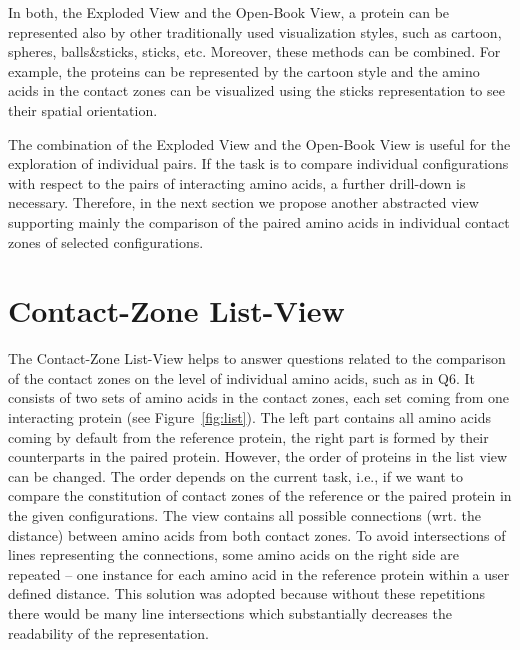 \documentclass[twocolumn]{bmcart}%
\def\OpBook {Open-Book View\xspace}
\def\ExpView {Exploded View\xspace}
\def\CoZoListView {Contact-Zone List-View\xspace}
\begin{document}
In both, the \ExpView and the \OpBook, a protein can be represented also by other traditionally used visualization styles, such as cartoon, spheres, balls\&sticks, sticks, etc.
Moreover, these methods can be combined. 
For example, the proteins can be represented by the cartoon style and the amino acids in the contact zones can be visualized using the sticks representation to see their spatial orientation.%

The combination of the \ExpView and the \OpBook is useful for the exploration of individual pairs.
If the task is to compare individual configurations with respect to the pairs of interacting amino acids, a further drill-down is necessary.
Therefore, in the next section we propose another abstracted view supporting mainly the comparison of the paired amino acids in individual contact zones of selected configurations.


\section{Contact-Zone List-View}
The \CoZoListView helps to answer questions related to the comparison of the contact zones on the level of individual amino acids, such as in Q6.
It consists of two sets of amino acids in the contact zones, each set coming from one interacting protein (see Figure~\ref{fig:list}).
The left part contains all amino acids coming by default from the reference protein, the right part is formed by their counterparts in the paired protein.
However, the order of proteins in the list view can be changed.
The order depends on the current task, i.e., if we want to compare the constitution of contact zones of the reference or the paired protein in the given configurations.
The view contains all possible connections (wrt. the distance) between amino acids from both contact zones.
To avoid intersections of lines representing the connections, some amino acids on the right side are repeated -- one instance for each amino acid in the reference protein within a user defined distance. 
This solution was adopted because without these repetitions there would be many line intersections which substantially decreases the readability of the representation.
\end{document}

